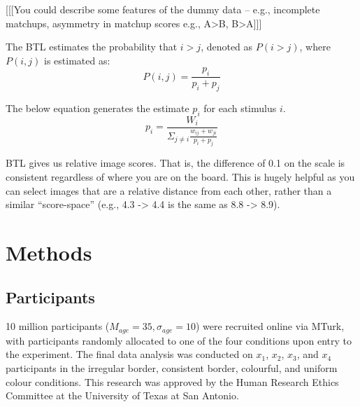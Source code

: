\documentclass[a4paper, natbib, doc, 12pt]{apa7}
\begin{document}

[[[You could describe some features of the dummy data -- e.g., incomplete matchups, asymmetry in matchup scores e.g., A>B, B>A]]]

The BTL estimates the probability that $i > j$, denoted as $P(i>j)$, where $P(i,j)$ is estimated as: 
\begin{equation}
    P(i, j) = \frac{p_{i}}{p_{i} + p_{j}}
\end{equation}

The below equation generates the estimate $p_{i}$ for each stimulus $i$.
\begin{equation}
    p_{i} = \frac{W_{i}}{\Sigma_{j\neq i}\frac{w_{ij}+w_{ji}}{p_{i}+p_{j}}}
\end{equation}

BTL gives us relative image scores. That is, the difference of 0.1 on the scale is consistent regardless of where you are on the board. This is hugely helpful as you can select images that are a relative distance from each other, rather than a similar ``score-space'' (e.g., 4.3 -> 4.4 is the same as 8.8 -> 8.9).

\section{Methods}
\subsection{Participants}
10 million participants ($M_{age} = 35,\sigma_{age} = 10$) were recruited online via MTurk, with participants randomly allocated to one of the four conditions upon entry to the experiment. The final data analysis was conducted on $x_{1}$, $x_{2}$, $x_{3}$, and $x_{4}$ participants in the irregular border, consistent border, colourful, and uniform colour conditions. This research was approved by the Human Research Ethics Committee at the University of Texas at San Antonio.
\end{document}

